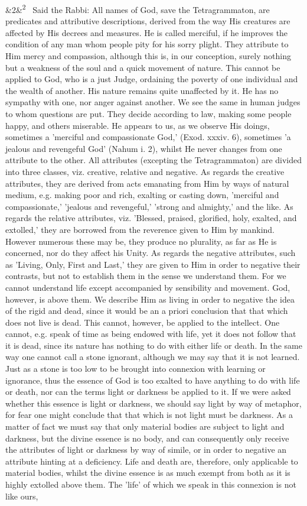\documentclass[12pt]{article}
\newcommand{\para}[1][]{\par\noindent\ifx&#1&\else\textsuperscript{\footnotesize #1}~\fi}
\begin{document}
\para[2] Said the Rabbi: All names of God, save the Tetragrammaton, are predicates and attributive descriptions, derived from the way His creatures are affected by His decrees and measures. He is called merciful, if he improves the condition of any man whom people pity for his sorry plight. They attribute to Him mercy and compassion, although this is, in our conception, surely nothing but a weakness of the soul and a quick movement of nature. This cannot be applied to God, who is a just Judge, ordaining the poverty of one individual and the wealth of another. His nature remains quite unaffected by it. He has no sympathy with one, nor anger against another. We see the same in human judges to whom questions are put. They decide according to law, making some people happy, and others miserable. He appears to us, as we observe His doings, sometimes a 'merciful and compassionate God,' (Exod. xxxiv. 6), sometimes 'a jealous and revengeful God' (Nahum i. 2), whilst He never changes from one attribute to the other. All attributes (excepting the Tetragrammaton) are divided into three classes, viz. creative, relative and negative. As regards the creative attributes, they are derived from acts emanating from Him by ways of natural medium, e.g. making poor and rich, exalting or casting down, 'merciful and compassionate,' 'jealous and revengeful,' 'strong and almighty,' and the like. As regards the relative attributes, viz. 'Blessed, praised, glorified, holy, exalted, and extolled,' they are borrowed from the reverence given to Him by mankind. However numerous these may be, they produce no plurality, as far as He is concerned, nor do they affect his Unity. As regards the negative attributes, such as 'Living, Only, First and Last,' they are given to Him in order to negative their contrasts, but not to establish them in the sense we understand them. For we cannot understand life except accompanied by sensibility and movement. God, however, is above them. We describe Him as living in order to negative the idea of the rigid and dead, since it would be an a priori conclusion that that which does not live is dead. This cannot, however, be applied to the intellect. One cannot, e.g. speak of time as being endowed with life, yet it does not follow that it is dead, since its nature has nothing to do with either life or death. In the same way one cannot call a stone ignorant, although we may say that it is not learned. Just as a stone is too low to be brought into connexion with learning or ignorance, thus the essence of God is too exalted to have anything to do with life or death, nor can the terms light or darkness be applied to it. If we were asked whether this essence is light or darkness, we should say light by way of metaphor, for fear one might conclude that that which is not light must be darkness. As a matter of fact we must say that only material bodies are subject to light and darkness, but the divine essence is no body, and can consequently only receive the attributes of light or darkness by way of simile, or in order to negative an attribute hinting at a deficiency. Life and death are, therefore, only applicable to material bodies, whilst the divine essence is as much exempt from both as it is highly extolled above them. The 'life' of which we speak in this connexion is not like ours, 
\end{document}
